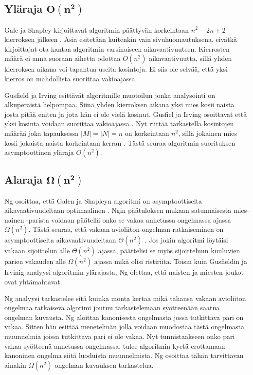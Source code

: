 \documentclass[gradu, twoside]{tktltiki}
\begin{document}
\subsection{Yläraja $\boldsymbol{O(n^2)}$}

Gale ja Shapley kirjoittavat algoritmin päättyvän korkeintaan $n^2 -
2n + 2$ kierroksen jälkeen \cite{galeshapley62}. Asia esitetään
kuitenkin vain sivuhuomautuksena, eivätkä kirjoittajat ota kantaa
algoritmin varsinaiseen aikavaativuuteen. Kierrosten määrä ei anna
suoraan aihetta odottaa $O(n^2)$ aikavaativuutta, sillä yhden
kierroksen aikana voi tapahtua useita kosintoja. Ei siis ole selvää,
että yksi kierros on mahdollista suorittaa vakioajassa.

Gusfield ja Irving esittävät algoritmille muotoilun \cite{gusfield89}
jonka analysointi on alkuperäistä helpompaa. Siinä yhden kierroksen
aikana yksi mies kosii naista josta pitää eniten ja jota hän ei ole
vielä kosinut. Gusfiel ja Irving osoittavat että yksi kosinta voidaan
suorittaa vakioajassa \cite{gusfield89}. Nyt riittää tarkastella
kosintojen määrää joka tapauksessa $|M| = |N| = n$ on korkeintaan
$n^2$, sillä jokainen mies kosii jokaista naista korkeintaan kerran
\cite{gusfield89}. Tästä seuraa algoritmin suorituksen asymptoottinen
yläraja $O(n^2)$.

\subsection{Alaraja $\boldsymbol{\Omega(n^2)}$}

Ng osoittaa, että Galen ja Shapleyn algoritmi on asymptoottiselta
aikavaativuudeltaan optimaalinen \cite{cheng89}. Ngin päätuloksen
mukaan satunnaisesta mies-nainen -parista voidaan päätellä onko se
vakaa annetussa ongelmassa ajassa $\Omega(n^2)$. Tästä seuraa, että
vakaan avioliiton ongelman ratkaiseminen on asymptoottiselta
aikavaativuudeltaan $\Theta(n^2)$ \cite{cheng89}. Jos jokin algoritmi
löytäisi vakaan sijoittelun alle $\Theta(n^2)$ ajassa, päättelisi se
myös sijoitteluun kuuluvien parien vakauden alle $\Omega(n^2)$ ajassa
mikä olisi ristiriita. Toisin kuin Gusfieldin ja Irvinig analyysi
algoritmin ylärajasta, Ng olettaa, että naisten ja miesten joukot ovat
yhtämahtavat.

Ng analyysi tarkastelee sitä kuinka monta kertaa mikä tahansa vakaan
avioliiton ongelmaa ratkaiseva algorimi joutuu tarkastelemaan
syötteenään saatua ongelman kuvausta. Ng aloittaa kanonisesta
ongelmasta jossa tutkittava pari on vakaa. Sitten hän esittää
menetelmän jolla voidaan muodostaa tästä ongelmasta muunnelmia joissa
tutkittava pari ei ole vakaa. Nyt tunnistaakseen onko pari vakaa
syötteenä annetussa ongelmassa, tulee algoritmin kyetä erottamaan
kanoninen ongelma siitä luoduista muunnelmista. Ng osoittaa tähän
tarvittavan ainakin $\Omega(n^2)$ ongelman kuvauksen tarkastelua.
\cite{cheng89}
\end{document}
